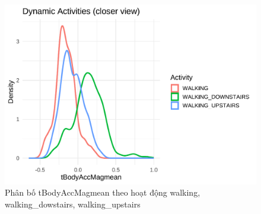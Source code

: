\documentclass[
]{article}
\begin{document}
\begin{figure}
\centering
\includegraphics{report_files/figure-latex/unnamed-chunk-15-1.pdf}
\caption{Phân bố tBodyAccMagmean theo hoạt động walking,
walking\_dowstairs, walking\_upstairs}
\end{figure}
\end{document}
